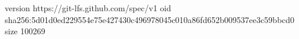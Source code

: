 version https://git-lfs.github.com/spec/v1
oid sha256:5d01d0ed229554e75e427430c496978045c010a86fd652b009537ee3c59bbcd0
size 100269
